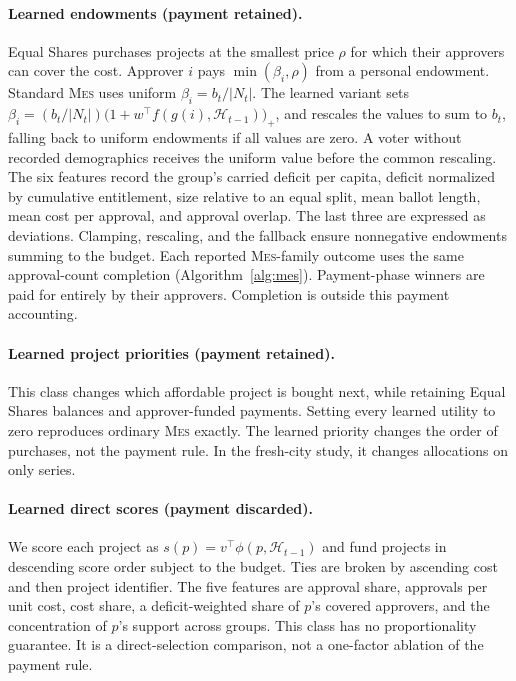 \documentclass{article}
\newcommand{\MES}{\textsc{Mes}}
\begin{document}
\paragraph{Learned endowments (payment retained).}
Equal Shares purchases projects at the smallest price $\rho$ for which their
approvers can cover the cost. Approver $i$ pays
$\min(\beta_i, \rho)$ from a personal endowment. Standard \MES{} uses uniform
$\beta_i = b_t/|N_t|$. The learned variant sets
$\beta_i = (b_t/|N_t|)\bigl(1 + w^{\top} f(g(i), \mathcal{H}_{t-1})\bigr)_{+}$,
and rescales the values to sum to $b_t$, falling back to uniform endowments if
all values are zero. A voter without recorded demographics receives the uniform
value before the common rescaling. The six features record
the group's carried deficit per capita, deficit normalized by cumulative
entitlement, size relative to an equal split, mean ballot length, mean cost per
approval, and approval overlap. The last three are expressed as deviations.
Clamping, rescaling, and the fallback ensure nonnegative endowments summing to
the budget. Each reported \MES-family outcome uses the same
approval-count completion (Algorithm~\ref{alg:mes}). Payment-phase winners are
paid for entirely by their approvers. Completion is outside this payment accounting.

\paragraph{Learned project priorities (payment retained).}
This class changes which affordable project is bought next, while retaining
Equal Shares balances and approver-funded payments. Setting every learned
utility to zero reproduces ordinary \MES{} exactly. The learned priority
changes the order of purchases, not the payment rule. In the fresh-city study,
it changes allocations on only \ExternalPriorityActuated{} series.

\paragraph{Learned direct scores (payment discarded).}
We score each project as $s(p) = v^{\top}\phi(p, \mathcal{H}_{t-1})$ and fund
projects in descending score order subject to the budget. Ties are broken by
ascending cost and then project identifier. The five features are approval share, approvals per
unit cost, cost share, a deficit-weighted share of $p$'s covered approvers, and
the concentration of $p$'s support across groups. This class has no
proportionality guarantee. It is a direct-selection comparison, not a
one-factor ablation of the payment rule.
\end{document}
